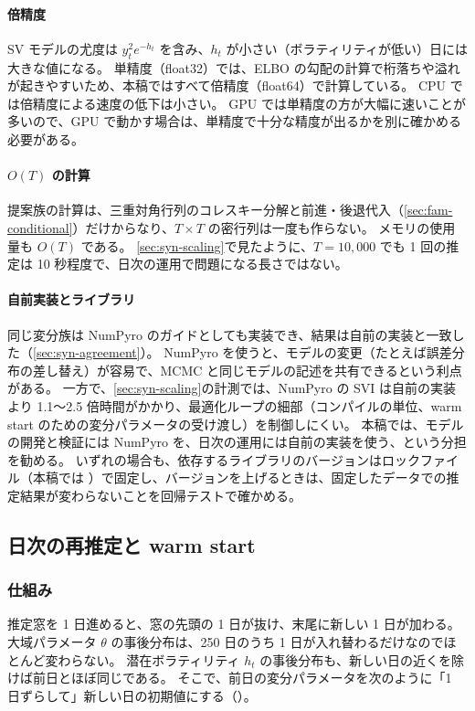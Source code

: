 \paragraph{倍精度}
SV モデルの尤度は $y_t^2 e^{-h_t}$ を含み、$h_t$ が小さい（ボラティリティが低い）日には大きな値になる。
単精度（float32）では、ELBO の勾配の計算で桁落ちや溢れが起きやすいため、本稿ではすべて倍精度（float64）で計算している。
CPU では倍精度による速度の低下は小さい。
GPU では単精度の方が大幅に速いことが多いので、GPU で動かす場合は、単精度で十分な精度が出るかを別に確かめる必要がある。

\paragraph{$O(T)$ の計算}
提案族の計算は、三重対角行列のコレスキー分解と前進・後退代入（\cref{sec:fam-conditional}）だけからなり、$T \times T$ の密行列は一度も作らない。
メモリの使用量も $O(T)$ である。
\cref{sec:syn-scaling}で見たように、$T = 10{,}000$ でも 1 回の推定は 10 秒程度で、日次の運用で問題になる長さではない。

\paragraph{自前実装とライブラリ}
同じ変分族は NumPyro のガイドとしても実装でき、結果は自前の実装と一致した（\cref{sec:syn-agreement}）。
NumPyro を使うと、モデルの変更（たとえば誤差分布の差し替え）が容易で、MCMC と同じモデルの記述を共有できるという利点がある。
一方で、\cref{sec:syn-scaling}の計測では、NumPyro の SVI は自前の実装より 1.1〜2.5 倍時間がかかり、最適化ループの細部（コンパイルの単位、warm start のための変分パラメータの受け渡し）を制御しにくい。
本稿では、モデルの開発と検証には NumPyro を、日次の運用には自前の実装を使う、という分担を勧める。
いずれの場合も、依存するライブラリのバージョンはロックファイル（本稿では ）で固定し、バージョンを上げるときは、固定したデータでの推定結果が変わらないことを回帰テストで確かめる。

\subsection{日次の再推定と warm start}\label{sec:sys-warm}

\subsubsection{仕組み}

推定窓を 1 日進めると、窓の先頭の 1 日が抜け、末尾に新しい 1 日が加わる。
大域パラメータ $\theta$ の事後分布は、250 日のうち 1 日が入れ替わるだけなのでほとんど変わらない。
潜在ボラティリティ $h_t$ の事後分布も、新しい日の近くを除けば前日とほぼ同じである。
そこで、前日の変分パラメータを次のように「1 日ずらして」新しい日の初期値にする（）。

